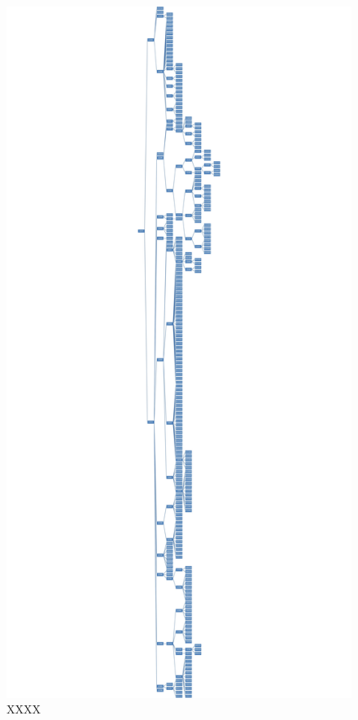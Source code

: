 \documentclass[12pt,a4paper,oneside]{book}
\begin{document}
\newpage
\begin{figure}[H]
    \centering
    \includegraphics[scale=0.1]{Images/tree2.jpg}
    \caption{XXXX}
    \label{fig:tree}
\end{figure}
\end{document}
